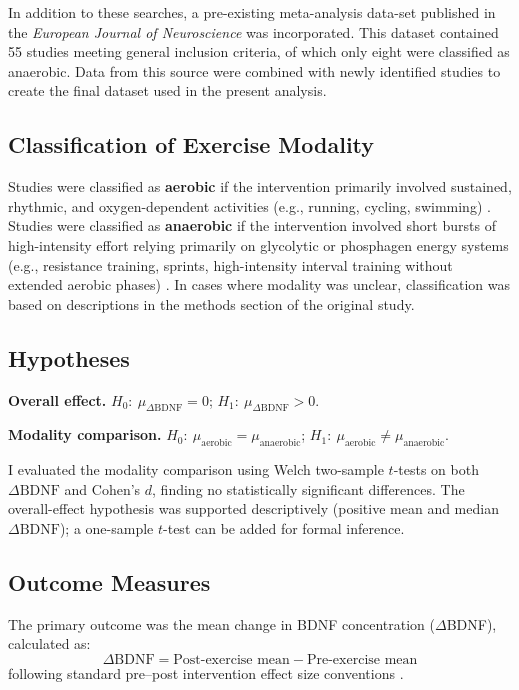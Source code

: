 \documentclass[runningheads]{llncs}
\begin{document}
In addition to these searches, a pre-existing meta-analysis data-set published in the \textit{European Journal of Neuroscience} \cite{ejn_dataset} was incorporated. This dataset contained 55 studies meeting general inclusion criteria, of which only eight were classified as anaerobic. Data from this source were combined with newly identified studies to create the final dataset used in the present analysis.
 

\subsection{Classification of Exercise Modality}
Studies were classified as \textbf{aerobic} if the intervention primarily involved sustained, rhythmic, and oxygen-dependent activities (e.g., running, cycling, swimming) \cite{damrongthai2021benefit}. Studies were classified as \textbf{anaerobic} if the intervention involved short bursts of high-intensity effort relying primarily on glycolytic or phosphagen energy systems (e.g., resistance training, sprints, high-intensity interval training without extended aerobic phases) \cite{winter2007high}. In cases where modality was unclear, classification was based on descriptions in the methods section of the original study.

\subsection{Hypotheses}
\textbf{Overall effect.} 
$H_0:\ \mu_{\Delta\text{BDNF}}=0$;\quad 
$H_1:\ \mu_{\Delta\text{BDNF}}>0$.

\textbf{Modality comparison.} 
$H_0:\ \mu_{\text{aerobic}}=\mu_{\text{anaerobic}}$;\quad 
$H_1:\ \mu_{\text{aerobic}}\neq\mu_{\text{anaerobic}}$.

I evaluated the modality comparison using Welch two-sample $t$-tests on both $\Delta\text{BDNF}$ and Cohen's $d$, finding no statistically significant differences. The overall-effect hypothesis was supported descriptively (positive mean and median $\Delta\text{BDNF}$); a one-sample $t$-test can be added for formal inference.


\subsection{Outcome Measures}
The primary outcome was the mean change in BDNF concentration ($\Delta$BDNF), calculated as:
\[
\Delta \text{BDNF} = \text{Post-exercise mean} - \text{Pre-exercise mean}
\]
following standard pre–post intervention effect size conventions \cite{winter2007high}.
\end{document}

